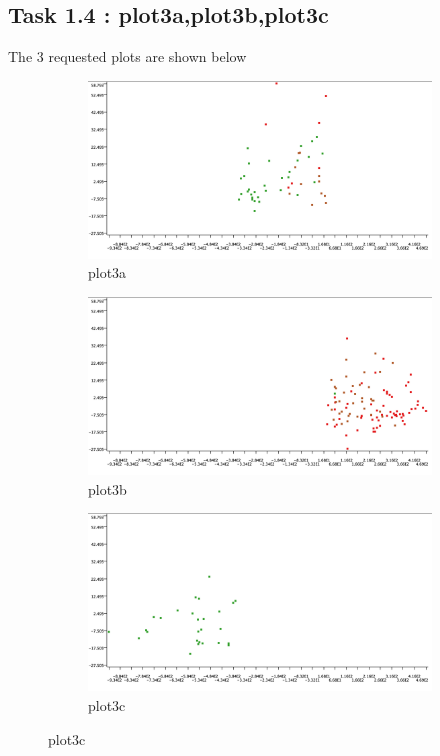 \documentclass[11pt]{article}
\begin{document}
	 \subsection*{Task 1.4 : plot3a,plot3b,plot3c}
		The 3 requested plots are shown below
		\iffalse
		 \begin{figure}[H]
		 	\centering
		 	\begin{subfigure}{0.4\textwidth}
		 		\includegraphics[width=\textwidth]{res/task-1/plot3a}
		 		\caption{plot3a}
		 		\label{fig:first}
		 	\end{subfigure}
		 	\hfill
		 	\begin{subfigure}{0.4\textwidth}
		 		\includegraphics[width=\textwidth]{res/task-1/plot3b}
		 		\caption{plot3b}
		 		\label{fig:second}
		 	\end{subfigure}
		 	\hfill
		 	\begin{subfigure}{0.4\textwidth}
		 		\includegraphics[width=\textwidth]{res/task-1/plot3c}
		 		\caption{plot3c}
		 		\label{fig:third}
		 	\end{subfigure}
		 	\label{fig:figures} 
		 \end{figure}
\end{document}
